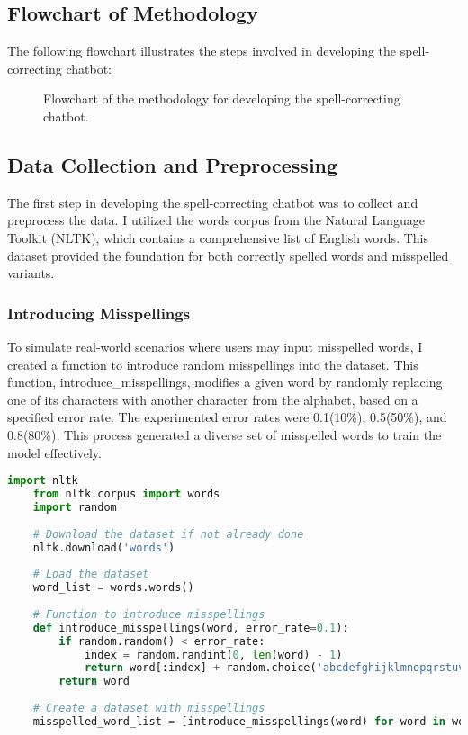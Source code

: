 
\subsection{Flowchart of Methodology}
The following flowchart illustrates the steps involved in developing the spell-correcting chatbot:
\begin{figure}[h!]
    \centering
    
    \caption{Flowchart of the methodology for developing the spell-correcting chatbot.}
    \label{fig:flowchart}
\end{figure}

\subsection{Data Collection and Preprocessing}
The first step in developing the spell-correcting chatbot was to collect and preprocess the data. I utilized the words corpus from the Natural Language Toolkit (NLTK), which contains a comprehensive list of English words. This dataset provided the foundation for both correctly spelled words and misspelled variants.

\subsubsection{Introducing Misspellings}
To simulate real-world scenarios where users may input misspelled words, I created a function to introduce random misspellings into the dataset. This function, introduce\_misspellings, modifies a given word by randomly replacing one of its characters with another character from the alphabet, based on a specified error rate. The experimented error rates were 0.1(10\%), 0.5(50\%), and 0.8(80\%). This process generated a diverse set of misspelled words to train the model effectively.
\begin{lstlisting}[language=Python, caption=Data Collection and Preprocessing]
    import nltk
    from nltk.corpus import words
    import random
    
    # Download the dataset if not already done
    nltk.download('words')
    
    # Load the dataset
    word_list = words.words()
    
    # Function to introduce misspellings
    def introduce_misspellings(word, error_rate=0.1):
        if random.random() < error_rate:
            index = random.randint(0, len(word) - 1)
            return word[:index] + random.choice('abcdefghijklmnopqrstuvwxyz') + word[index + 1:]
        return word
    
    # Create a dataset with misspellings
    misspelled_word_list = [introduce_misspellings(word) for word in word_list]
    
\end{lstlisting}

